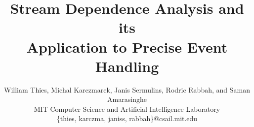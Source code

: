 \documentclass{sig-alternate}
\title{Stream Dependence Analysis and its \\ Application to Precise Event Handling}
\author{
	William Thies, Michal Karczmarek, Janis Sermulins, Rodric Rabbah, and Saman Amarasinghe\\
	\small MIT Computer Science and Artificial Intelligence Laboratory\\
	\small \{thies, karczma, janiss, rabbah\}@csail.mit.edu
}
\begin{document}
\newtheorem{definition}{Definition}
\newtheorem{theorem}{Theorem}
\newtheorem{algorithm}{Algorithm}

\maketitle

\newcommand{\figsdep}[0]{\mt{SDEP}}
\newcommand{\figsdepf}[2]{\mt{SDEP}_{#1 \small{\leftarrow} #2}}
\newcommand{\sdep}[0]{\textsc{sdep}}
\newcommand{\sdepf}[2]{\sdep_{#1 \small{\leftarrow} #2}}
\newcommand{\floor}[2]{\left\lfloor\frac{#1}{#2}\right\rfloor}
\newcommand{\ceil}[2]{\left\lceil\frac{#1}{#2}\right\rceil}

\newcommand{\mt}[1]{\mbox{\it #1}}
\newcommand{\todo}[1]{\framebox{\bf #1}}
\newcommand{\naive}[0]{na\"{\i}ve}
\newcommand{\Naive}[0]{Na\"{\i}ve}
\newcommand{\makeline}[0]{\rule{0cm}{0cm}\\\hrule\rule{0cm}{0cm}}

\begin{abstract}

\end{abstract}






%



{\small
  
  
}


%


\clearpage
%
\clearpage
%
\end{document}
